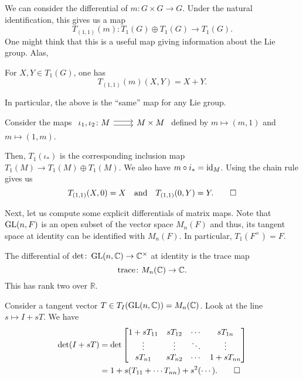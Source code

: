 \documentclass[12pt]{article}
\begin{document}
We can consider the differential of $m \colon G \times G \to G$. 
Under the natural identification, this gives us a map
\begin{equation*} 
	T_{(1, 1)}(m) \colon T_{1}(G) \oplus T_{1}(G) \to T_{1}(G).
\end{equation*}
One might think that this is a useful map giving information about the Lie group. Alas,
\begin{thm}
	For $X, Y \in T_{1}(G)$, one has
	\begin{equation*} 
		T_{(1, 1)}(m)(X, Y) = X + Y.
	\end{equation*}
\end{thm}
In particular, the above is the ``same'' map for any Lie group.
\begin{sketch}
	Consider the maps $\begin{tikzcd} \iota_{1}, \iota_{2} \colon M \arrow[r, shift left] \arrow[r, shift right] & M \times M \end{tikzcd}$ defined by $m \mapsto (m, 1)$ and $m \mapsto (1, m)$. 

	Then, $T_{1}(\iota_{\ast})$ is the corresponding inclusion map $T_{1}(M) \to T_{1}(M) \oplus T_{1}(M)$. 
	We also have $m \circ i_{\ast} = \operatorname{id}_{M}$. \newline
	Using the chain rule gives us
	\begin{equation*} 
		T_{(1, 1)}(X, 0) = X \quad\text{and}\quad T_{(1, 1)}(0, Y) = Y. \qedhere
	\end{equation*}
\end{sketch}

Next, let us compute some explicit differentials of matrix maps. Note that $\operatorname{GL}(n, F)$ is an open subset of the vector space $M_{n}(F)$ and thus, its tangent space at identity can be identified with $M_{n}(F)$. \newline
In particular, $T_{1}(F^{\times}) = F$.

\begin{thm} \label{thm:diff-complex-det-is-trace}
	The differential of $\det \colon \operatorname{GL}(n, \mathbb{C}) \to \mathbb{C}^{\times}$ at identity is the trace map
	\begin{equation*} 
		\operatorname{trace} \colon M_{n}(\mathbb{C}) \to \mathbb{C}.
	\end{equation*}
	This has rank two over $\mathbb{R}$.
\end{thm}
\begin{sketch}
	Consider a tangent vector $T \in T_{I}(\operatorname{GL}(n, \mathbb{C})) = M_{n}(\mathbb{C})$. 
	Look at the line $s \mapsto I + sT$. 
	We have
	\begin{align*} 
		\det(I + sT) &
		= \det
		\begin{bmatrix}
			1 + s T_{11} & s T_{12} & \cdots & s T_{1n} \\
			\vdots & \vdots & \ddots & \vdots \\
			s T_{n1} & s T_{n2} & \cdots & 1 + s T_{nn} \\
		\end{bmatrix} \\
		&= 1 + s(T_{11} + \cdots T_{nn}) + s^{2}(\cdots). \qedhere
	\end{align*}
\end{sketch}
\end{document}
